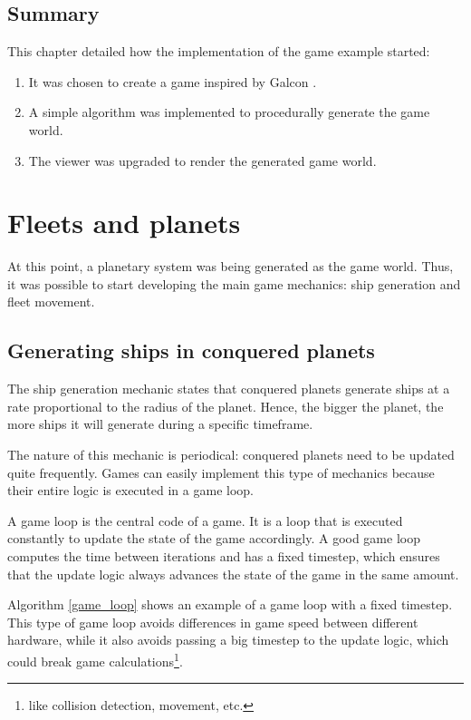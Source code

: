 \documentclass[a4paper,11pt,titlepage,abstract,numbers=noenddot,automark,mnsy,intlimits,rgb,dvipsnames]{report}
\begin{document}
\section{Summary}
This chapter detailed how the implementation of the game example started:
\begin{enumerate}
\item
It was chosen to create a game inspired by Galcon \cite{galcon}.
\item
A simple algorithm was implemented to procedurally generate the game world.
\item
The viewer was upgraded to render the generated game world.
\end{enumerate}
\chapter{Fleets and planets}
\label{fleets_planets}
At this point, a planetary system was being generated as the game world. Thus, it was possible to start developing 
the main game mechanics: ship generation and fleet movement.
\section{Generating ships in conquered planets}
The ship generation mechanic states that conquered planets generate ships at a rate proportional to the
radius of the planet. Hence, the bigger the planet, the more ships it will generate during a specific timeframe.

The nature of this mechanic is periodical: conquered planets need to be updated quite frequently. Games can easily
implement this type of mechanics because their entire logic is executed in a game loop.

A game loop is the central code of a game. It is a loop that is executed constantly to update the state of
the game accordingly. A good game loop computes the time between iterations and has a fixed timestep, which ensures
that the update logic always advances the state of the game in the same amount.

Algorithm \autoref{game_loop} shows an example of a game loop with a fixed timestep. This type of game loop
avoids differences in game speed between different hardware, while it also avoids passing a big timestep to the
update logic, which could break game calculations\footnote{like collision detection, movement, etc.}.
\end{document}
